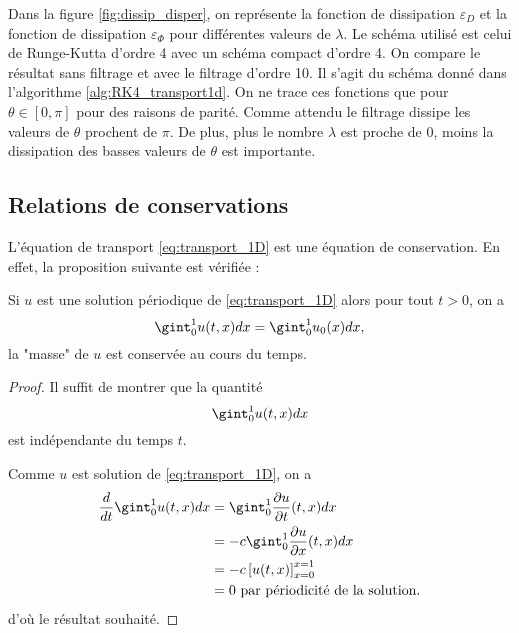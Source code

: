 Dans la figure \ref{fig:dissip_disper}, on représente la fonction de dissipation $\varepsilon_D$ et la fonction de dissipation $\varepsilon_{\Phi}$ pour différentes valeurs de $\lambda$. Le schéma utilisé est celui de Runge-Kutta d'ordre 4 avec un schéma compact d'ordre 4. On compare le résultat sans filtrage et avec le filtrage d'ordre 10. Il s'agit du schéma donné dans l'algorithme \ref{alg:RK4_transport1d}.
On ne trace ces fonctions que pour $\theta \in [0, \pi]$ pour des raisons de parité. Comme attendu le filtrage dissipe les valeurs de $\theta$ prochent de $\pi$. De plus, plus le nombre $\lambda$ est proche de $0$, moins la dissipation des basses valeurs de $\theta$ est importante. 







\subsection{Relations de conservations}

L'équation de transport \eqref{eq:transport_1D} est une équation de conservation. En effet, la proposition suivante est vérifiée :

\begin{proposition}
Si $u$ est une solution périodique de \eqref{eq:transport_1D} alors pour tout $t>0$, on a
\begin{equation}
\gint_0^1 u(t,x)dx = \gint_0^1 u_0(x)dx,
\end{equation}
la "masse" de $u$ est conservée au cours du temps.
\end{proposition}

\begin{proof}
Il suffit de montrer que la quantité
\begin{equation}
\gint_0^1 u(t,x)dx
\end{equation}
est indépendante du temps $t$.

Comme $u$ est solution de \eqref{eq:transport_1D}, on a
\begin{align*}
\dfrac{d}{dt} \gint_0^1 u(t,x) dx & = \gint_0^1 \dfrac{\partial u}{\partial t}(t,x) dx \\
	& = - c \gint_0^1 \dfrac{\partial u}{\partial x} (t,x) dx \\
	& = - c \left[ u(t,x) \right]_{x=0}^{x=1} \\
	& = 0 \text{ par périodicité de la solution.}
\end{align*}
d'où le résultat souhaité.
\end{proof}

